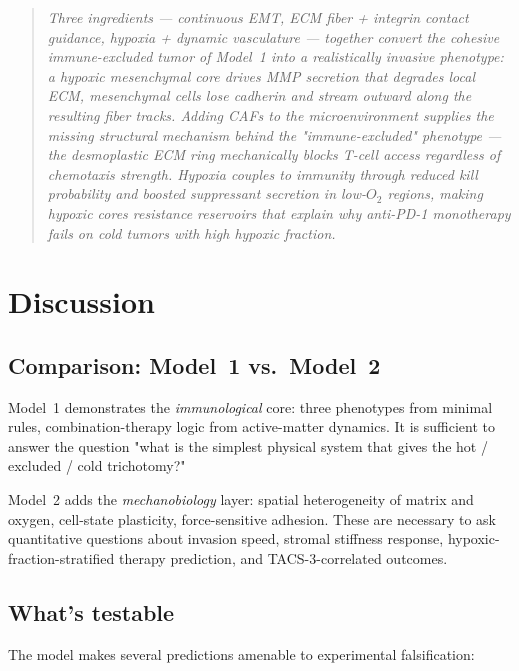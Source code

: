 \documentclass[11pt,letterpaper]{article}
\begin{document}
\begin{quote}
\emph{Three ingredients --- continuous EMT, ECM fiber + integrin
contact guidance, hypoxia + dynamic vasculature --- together convert
the cohesive immune-excluded tumor of Model~1 into a realistically
invasive phenotype: a hypoxic mesenchymal core drives MMP secretion
that degrades local ECM, mesenchymal cells lose cadherin and stream
outward along the resulting fiber tracks. Adding CAFs to the
microenvironment supplies the missing \emph{structural} mechanism
behind the "immune-excluded" phenotype --- the desmoplastic ECM ring
mechanically blocks T-cell access regardless of chemotaxis strength.
Hypoxia couples to immunity through reduced kill probability and
boosted suppressant secretion in low-$O_2$ regions, making hypoxic
cores resistance reservoirs that explain why anti-PD-1 monotherapy
fails on cold tumors with high hypoxic fraction.}
\end{quote}

\section{Discussion}

\subsection{Comparison: Model~1 vs.\ Model~2}

\noindent
Model~1 demonstrates the \emph{immunological} core: three phenotypes
from minimal rules, combination-therapy logic from active-matter
dynamics. It is sufficient to answer the question "what is the simplest
physical system that gives the hot / excluded / cold trichotomy?"

\noindent
Model~2 adds the \emph{mechanobiology} layer: spatial heterogeneity of
matrix and oxygen, cell-state plasticity, force-sensitive adhesion.
These are necessary to ask quantitative questions about invasion speed,
stromal stiffness response, hypoxic-fraction-stratified therapy
prediction, and TACS-3-correlated outcomes.

\subsection{What's testable}

The model makes several predictions amenable to experimental falsification:
\end{document}
